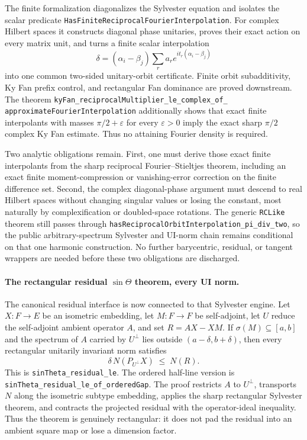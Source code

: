 \documentclass[11pt]{article}
\theoremstyle{remark}
\begin{document}
The finite formalization diagonalizes the Sylvester equation and isolates the
scalar predicate
\texttt{HasFiniteReciprocalFourierInterpolation}.  For complex Hilbert spaces
it constructs diagonal phase unitaries, proves their exact action on every
matrix unit, and turns a finite scalar interpolation
\[
  \delta=(\alpha_i-\beta_j)
    \sum_r a_r e^{it_r(\alpha_i-\beta_j)}
\]
into one common two-sided unitary-orbit certificate.  Finite orbit
subadditivity, Ky Fan prefix control, and rectangular Fan dominance are proved
downstream.  The theorem
\texttt{kyFan\_reciprocalMultiplier\_le\_complex\_of\_}
\texttt{approximateFourierInterpolation} additionally shows that exact finite
interpolants with masses $\pi/2+\varepsilon$ for every $\varepsilon>0$ imply
the exact sharp $\pi/2$ complex Ky Fan estimate.  Thus no attaining Fourier
density is required.

Two analytic obligations remain.  First, one must derive those exact finite
interpolants from the sharp reciprocal Fourier--Stieltjes theorem, including an
exact finite moment-compression or vanishing-error correction on the finite
difference set.  Second, the complex diagonal-phase argument must descend to
real Hilbert spaces without changing singular values or losing the constant,
most naturally by complexification or doubled-space rotations.  The generic
\texttt{RCLike} theorem still passes through
\texttt{hasReciprocalOrbitInterpolation\_pi\_div\_two}, so the public
arbitrary-spectrum Sylvester and UI-norm chain remains conditional on that one
harmonic construction.  No further barycentric, residual, or tangent wrappers
are needed before these two obligations are discharged.

\paragraph{The rectangular residual $\sin\Theta$ theorem, every UI norm.}
The canonical residual interface is now connected to that Sylvester engine.
Let $X:F\to E$ be an isometric embedding, let $M:F\to F$ be self-adjoint,
let $U$ reduce the self-adjoint ambient operator $A$, and set
$R=AX-XM$.  If $\sigma(M)\subseteq[a,b]$ and the spectrum of $A$ carried by
$U^{\perp}$ lies outside $(a-\delta,b+\delta)$, then every rectangular
unitarily invariant norm satisfies
\[
  \delta\,N(P_{U^{\perp}}X) \;\le\; N(R).
\]
This is \texttt{sinTheta\_residual\_le}.  The ordered half-line version is
\texttt{sinTheta\_residual\_le\_of\_orderedGap}.  The proof restricts $A$ to
$U^{\perp}$, transports $N$ along the isometric subtype embedding, applies
the sharp rectangular Sylvester theorem, and contracts the projected residual
with the operator-ideal inequality.  Thus the theorem is genuinely
rectangular: it does not pad the residual into an ambient square map or lose a
dimension factor.
\end{document}
